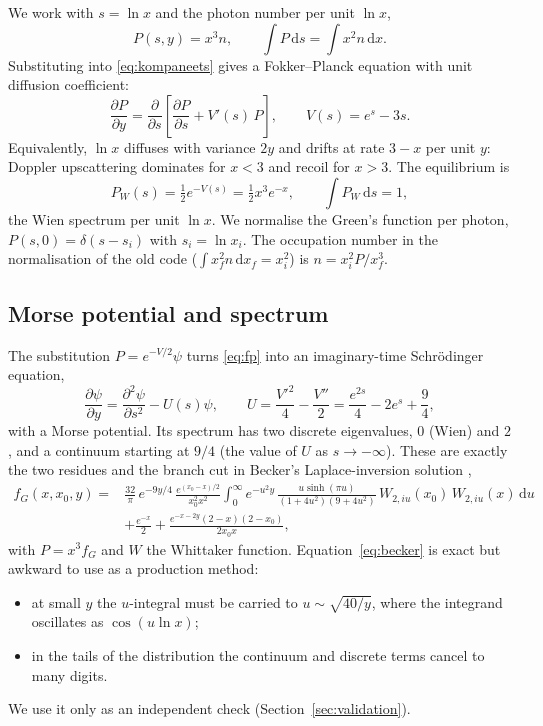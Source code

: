 \documentclass[11pt]{article}
\newcommand{\dd}{\mathrm{d}}
\begin{document}
We work with $s=\ln x$ and the photon number per unit $\ln x$,
\begin{equation}
  P(s,y) = x^3 n, \qquad \int P\,\dd s = \int x^2 n\,\dd x .
\end{equation}
Substituting into \eqref{eq:kompaneets} gives a Fokker--Planck equation with
unit diffusion coefficient:
\begin{equation}\label{eq:fp}
  \frac{\partial P}{\partial y} = \frac{\partial}{\partial s}
  \left[\frac{\partial P}{\partial s} + V'(s)\,P\right],
  \qquad V(s) = e^s - 3s .
\end{equation}
Equivalently, $\ln x$ diffuses with variance $2y$ and drifts at rate
$3-x$ per unit $y$: Doppler upscattering dominates for $x<3$ and recoil for
$x>3$. The equilibrium is
\begin{equation}
  P_W(s) = \tfrac12 e^{-V(s)} = \tfrac12 x^3e^{-x},
  \qquad \int P_W\,\dd s = 1,
\end{equation}
the Wien spectrum per unit $\ln x$. We normalise the Green's function per
photon, $P(s,0)=\delta(s-s_i)$ with $s_i=\ln x_i$. The occupation number in
the normalisation of the old code ($\int x_f^2 n\,\dd x_f = x_i^2$) is
$n = x_i^2 P/x_f^3$.

\subsection{Morse potential and spectrum}

The substitution $P=e^{-V/2}\psi$ turns \eqref{eq:fp} into an imaginary-time
Schr\"odinger equation,
\begin{equation}\label{eq:schrodinger}
  \frac{\partial\psi}{\partial y} = \frac{\partial^2\psi}{\partial s^2} - U(s)\psi,
  \qquad U = \frac{V'^2}{4}-\frac{V''}{2} = \frac{e^{2s}}{4}-2e^s+\frac94 ,
\end{equation}
with a Morse potential. Its spectrum has two discrete eigenvalues, $0$ (Wien)
and $2$, and a continuum starting at $9/4$ (the value of $U$ as
$s\to-\infty$). These are exactly the two residues and the branch cut in
Becker's Laplace-inversion solution \citep[][see also \citealt{nagirner1997}]{becker2003},
\begin{align}\label{eq:becker}
  f_G(x,x_0,y) ={}& \frac{32}{\pi}\,e^{-9y/4}\,\frac{e^{(x_0-x)/2}}{x_0^2x^2}
  \int_0^\infty e^{-u^2y}\,\frac{u\sinh(\pi u)}{(1+4u^2)(9+4u^2)}\,
  W_{2,iu}(x_0)\,W_{2,iu}(x)\,\dd u \nonumber\\
  &+ \frac{e^{-x}}{2} + \frac{e^{-x-2y}(2-x)(2-x_0)}{2x_0x},
\end{align}
with $P=x^3f_G$ and $W$ the Whittaker function. Equation~\eqref{eq:becker} is
exact but awkward to use as a production method:
\begin{itemize}
\item at small $y$ the $u$-integral must be carried to $u\sim\sqrt{40/y}$, where
  the integrand oscillates as $\cos(u\ln x)$;
\item in the tails of the distribution the continuum and discrete terms cancel
  to many digits.
\end{itemize}
We use it only as an independent check (Section~\ref{sec:validation}).
\end{document}
